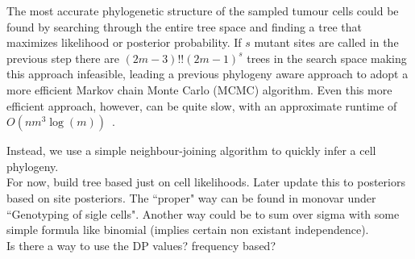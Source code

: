\documentclass[../../main.tex]{subfiles}
\begin{document}
The most accurate phylogenetic structure of the sampled tumour cells could be found by searching through the entire tree space and finding a tree that maximizes likelihood or posterior probability. If $s$ mutant sites are called in the previous step there are $(2m-3)!!(2m-1)^s$ trees in the search space making this approach infeasible, leading a previous phylogeny aware approach to adopt a more efficient Markov chain Monte Carlo (MCMC) algorithm. Even this more efficient approach, however, can be quite slow, with an approximate runtime of $O(nm^3\log(m))$~\cite{sciphi}.

Instead, we use a simple neighbour-joining algorithm to quickly infer a cell phylogeny.\\

For now, build tree based just on cell likelihoods. Later update this to posteriors based on site posteriors. The ``proper" way can be found in monovar under ``Genotyping of sigle cells". Another way could be to sum over sigma with some simple formula like binomial (implies certain non existant independence).\\

Is there a way to use the DP values? frequency based?\\

\end{document}
